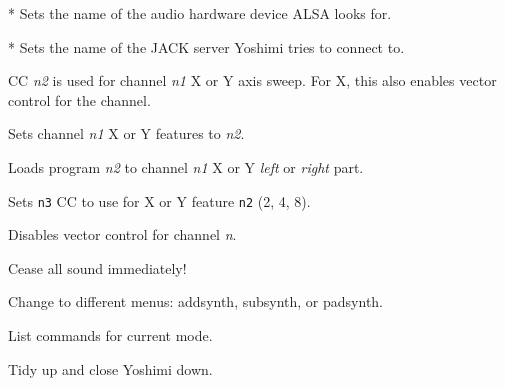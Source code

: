       * Sets the name of the audio hardware device ALSA looks for.

      * Sets the name of the JACK server Yoshimi tries to connect to.

      CC \textsl{n2} is used for channel \textsl{n1} X or Y axis sweep.
      For X, this also enables vector control for the channel.

      Sets channel \textsl{n1} X or Y features to \textsl{n2}.

      Loads program \textsl{n2} to channel \textsl{n1} X or Y
      \textsl{left} or \textsl{right} part.

      Sets \texttt{n3} CC to use for X or Y feature \texttt{n2}
      (2, 4, 8).

      Disables vector control for channel \textsl{n}.

      Cease all sound immediately!

      Change to different menus: addsynth, subsynth, or padsynth.

      List commands for current mode.

         Tidy up and close Yoshimi down.

